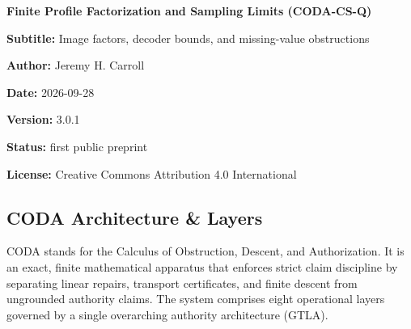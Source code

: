 \documentclass[
  11pt,
]{article}
\begin{document}
\begin{center}
{\Large\bfseries Finite Profile Factorization and Sampling Limits (CODA-CS-Q)}\par
\textbf{Subtitle:} Image factors, decoder bounds, and missing-value obstructions

\textbf{Author:} Jeremy H. Carroll

\textbf{Date:} 2026-09-28

\textbf{Version:} 3.0.1

\textbf{Status:} first public preprint

\textbf{License:} Creative Commons Attribution 4.0 International

\end{center}

\subsection{CODA Architecture \& Layers}\label{coda-architecture-layers}

CODA stands for the Calculus of Obstruction, Descent, and Authorization. It is an exact, finite mathematical apparatus that enforces strict claim discipline by separating linear repairs, transport certificates, and finite descent from ungrounded authority claims. The system comprises eight operational layers governed by a single overarching authority architecture (GTLA).
\end{document}
